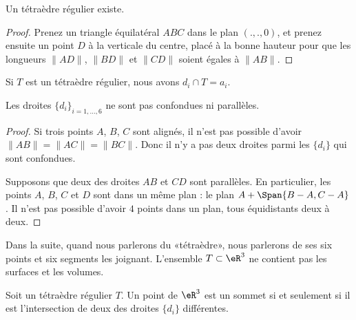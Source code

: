 \begin{lemma}
	Un tétraèdre régulier existe.
\end{lemma}

\begin{proof}
	Prenez un triangle équilatéral \( ABC\) dans le plan \( (.,.,0)\), et prenez ensuite un point \( D\) à la verticale du centre, placé à la bonne hauteur pour que les longueurs \( \| AD \|\), \( \| BD \|\) et \( \| CD \|\) soient égales à \( \| AB \|\).
\end{proof}

\begin{lemma}       \label{LEMooNWELooZeSEMN}
	Si \( T\) est un tétraèdre régulier, nous avons \( d_i\cap T=a_i\).
\end{lemma}

\begin{lemma}       \label{LEMooUSKVooQJiBuz}
	Les droites \( \{ d_i \}_{i=1,\ldots, 6}\) ne sont pas confondues ni parallèles.
\end{lemma}

\begin{proof}
	Si trois points \( A\), \( B\), \( C\) sont alignés, il n'est pas possible d'avoir \( \| AB \|=\| AC \|=\| BC \|\). Donc il n'y a pas deux droites parmi les \( \{ d_i \}\) qui sont confondues.

	Supposons que deux des droites \( AB\) et \( CD\) sont parallèles. En particulier, les points \( A\), \( B\), \( C\) et \( D\) sont dans un même plan : le plan \( A+\Span\{ B-A, C-A \}\). Il n'est pas possible d'avoir \( 4\) points dans un plan, tous équidistants deux à deux.
\end{proof}

Dans la suite, quand nous parlerons du «tétraèdre», nous parlerons de ses six points et six segments les joignant. L'ensemble \( T\subset \eR^3\) ne contient pas les surfaces et les volumes.

\begin{lemma}   \label{LEMooJCMKooOjMqtw}
	Soit un tétraèdre régulier \( T\). Un point de \( \eR^3\) est un sommet si et seulement si il est l'intersection de deux des droites \( \{ d_i \}\) différentes.
\end{lemma}

